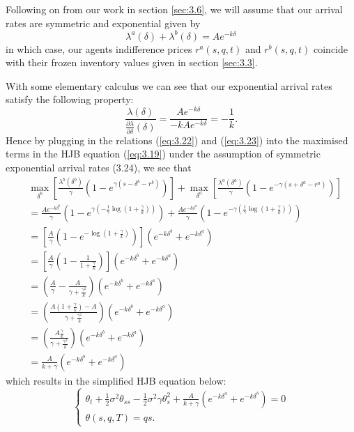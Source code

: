Following on from our work in section \ref{sec:3.6}, we will assume that our arrival 
rates are symmetric and exponential given by 
\begin{equation}\label{eq:3.24}
    \lambda^a(\delta)+\lambda^b(\delta)=Ae^{-k\delta}
\end{equation}
in which case, our agents indifference prices $r^a(s,q,t)$ and $r^b(s,q,t)$
coincide with their frozen inventory values given in section \ref{sec:3.3}.

With some elementary calculus we can see that our exponential arrival rates satisfy
the following property:
\begin{equation*}
    \frac{\lambda(\delta)}{\frac{\partial\lambda}{\partial\delta}(\delta)}=\frac{Ae^{-k\delta}}{-kAe^{-k\delta}}=-\frac{1}{k}.
\end{equation*}
Hence by plugging in the relations (\ref{eq:3.22}) and (\ref{eq:3.23}) into the 
maximised terms in the HJB equation (\ref{eq:3.19}) under the assumption of symmetric
exponential arrival rates (3.24), we see that
\begin{align*}
    &\max\limits_{\delta^b}\left[\frac{\lambda^b(\delta^b)}{\gamma}(1-e^{\gamma(s-\delta^b-r^b)})\right]+\max\limits_{\delta^a}\left[\frac{\lambda^a(\delta^a)}{\gamma}(1-e^{-\gamma(s+\delta^a-r^a)})\right]\\
    &=\frac{Ae^{-k\delta^b}}{\gamma}\left(1-e^{\gamma\left(-\frac{1}{\gamma}\log\left(1+\frac{\gamma}{k}\right)\right)}\right)+\frac{Ae^{-k\delta^a}}{\gamma}\left(1-e^{-\gamma\left(\frac{1}{\gamma}\log\left(1+\frac{\gamma}{k}\right)\right)}\right)\\
    &=\left[\frac{A}{\gamma}\left(1-e^{-\log\left(1+\frac{\gamma}{k}\right)}\right)\right](e^{-k\delta^b}+e^{-k\delta^a})\\
    &=\left[\frac{A}{\gamma}\left(1-\frac{1}{1+\frac{\gamma}{k}}\right)\right](e^{-k\delta^b}+e^{-k\delta^a})\\
    &=\left(\frac{A}{\gamma}-\frac{A}{\gamma+\frac{\gamma^2}{k}}\right)(e^{-k\delta^b}+e^{-k\delta^a})\\
    &=\left(\frac{A\left(1+\frac{\gamma}{k}\right)-A}{\gamma+\frac{\gamma^2}{k}}\right)(e^{-k\delta^b}+e^{-k\delta^a})\\
    &=\left(\frac{A\frac{\gamma}{k}}{\gamma+\frac{\gamma^2}{k}}\right)(e^{-k\delta^b}+e^{-k\delta^a})\\
    &=\frac{A}{k+\gamma}(e^{-k\delta^b}+e^{-k\delta^a})
\end{align*}
which results in the simplified HJB equation below:
\begin{equation}\label{eq:simp-hjb}
    \begin{cases} 
        \theta_t+\frac{1}{2}\sigma^2\theta_{ss}-\frac{1}{2}\sigma^2\gamma\theta^2_s+\frac{A}{k+\gamma}(e^{-k\delta^a}+e^{-k\delta^b})=0\\
        \theta(s,q,T)=qs.
    \end{cases}
\end{equation}

